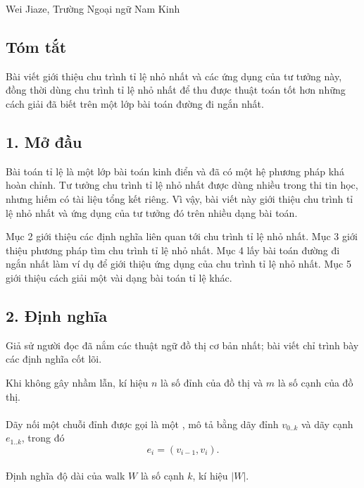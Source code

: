 \documentclass[11pt]{article}
\begin{document}
\begin{center}
Wei Jiaze, Trường Ngoại ngữ Nam Kinh
\end{center}

\subsection*{Tóm tắt}

Bài viết giới thiệu chu trình tỉ lệ nhỏ nhất và các ứng dụng của tư tưởng này,
đồng thời dùng chu trình tỉ lệ nhỏ nhất để thu được thuật toán tốt hơn những
cách giải đã biết trên một lớp bài toán đường đi ngắn nhất.

\subsection*{1. Mở đầu}

Bài toán tỉ lệ là một lớp bài toán kinh điển và đã có một hệ phương pháp khá
hoàn chỉnh. Tư tưởng chu trình tỉ lệ nhỏ nhất được dùng nhiều trong thi tin
học, nhưng hiếm có tài liệu tổng kết riêng. Vì vậy, bài viết này giới thiệu
chu trình tỉ lệ nhỏ nhất và ứng dụng của tư tưởng đó trên nhiều dạng bài toán.

Mục 2 giới thiệu các định nghĩa liên quan tới chu trình tỉ lệ nhỏ nhất. Mục 3
giới thiệu phương pháp tìm chu trình tỉ lệ nhỏ nhất. Mục 4 lấy bài toán đường
đi ngắn nhất làm ví dụ để giới thiệu ứng dụng của chu trình tỉ lệ nhỏ nhất.
Mục 5 giới thiệu cách giải một vài dạng bài toán tỉ lệ khác.

\subsection*{2. Định nghĩa}

Giả sử người đọc đã nắm các thuật ngữ đồ thị cơ bản nhất; bài viết chỉ trình
bày các định nghĩa cốt lõi.

Khi không gây nhầm lẫn, kí hiệu \(n\) là số đỉnh của đồ thị và \(m\) là số
cạnh của đồ thị.

\paragraph{}
Dãy nối một chuỗi đỉnh được gọi là một , mô tả bằng dãy đỉnh
\(v_{0..k}\) và dãy cạnh \(e_{1..k}\), trong đó
\[
  e_i=(v_{i-1},v_i).
\]

\paragraph{}
Định nghĩa độ dài của walk \(W\) là số cạnh \(k\), kí hiệu \(|W|\).
\end{document}
